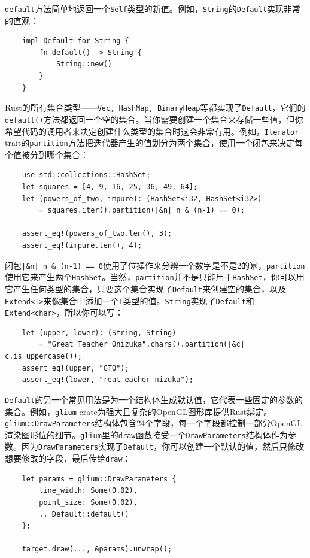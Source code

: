 \texttt{default}方法简单地返回一个\texttt{Self}类型的新值。例如，\texttt{String}的\texttt{Default}实现非常的直观：
\begin{verbatim}
    impl Default for String {
        fn default() -> String {
            String::new()
        }
    }    
\end{verbatim}

Rust的所有集合类型——\texttt{Vec, HashMap, BinaryHeap}等都实现了\texttt{Default}，它们的\texttt{default()}方法都返回一个空的集合。当你需要创建一个集合来存储一些值，但你希望代码的调用者来决定创建什么类型的集合时这会非常有用。例如，\texttt{Iterator} trait的\texttt{partition}方法把迭代器产生的值划分为两个集合，使用一个闭包来决定每个值被分到哪个集合：
\begin{verbatim}
    use std::collections::HashSet;
    let squares = [4, 9, 16, 25, 36, 49, 64];
    let (powers_of_two, impure): (HashSet<i32, HashSet<i32>)
        = squares.iter().partition(|&n| n & (n-1) == 0);
    
    assert_eq!(powers_of_two.len(), 3);
    assert_eq!(impure.len(), 4);
\end{verbatim}

闭包\texttt{|\&n| n \& (n-1) == 0}使用了位操作来分辨一个数字是不是2的幂，\texttt{partition}使用它来产生两个\texttt{HashSet}。当然，\texttt{partition}并不是只能用于\texttt{HashSet}，你可以用它产生任何类型的集合，只要这个集合实现了\texttt{Default}来创建空的集合，以及\texttt{Extend<T>}来像集合中添加一个\texttt{T}类型的值。\texttt{String}实现了\texttt{Default}和\\
\texttt{Extend<char>}，所以你可以写：
\begin{verbatim}
    let (upper, lower): (String, String)
        = "Great Teacher Onizuka".chars().partition(|&c| c.is_uppercase());
    assert_eq!(upper, "GTO");
    assert_eq!(lower, "reat eacher nizuka");
\end{verbatim}

\texttt{Default}的另一个常见用法是为一个结构体生成默认值，它代表一些固定的参数的集合。例如，\texttt{glium} crate为强大且复杂的OpenGL图形库提供Rust绑定。\texttt{glium::DrawParameters}结构体包含24个字段，每一个字段都控制一部分OpenGL渲染图形位的细节。\texttt{glium}里的\texttt{draw}函数接受一个\texttt{DrawParameters}结构体作为参数。因为\texttt{DrawParameters}实现了\texttt{Default}，你可以创建一个默认的值，然后只修改想要修改的字段，最后传给\texttt{draw}：
\begin{verbatim}
    let params = glium::DrawParameters {
        line_width: Some(0.02),
        point_size: Some(0.02),
        .. Default::default()
    };

    target.draw(..., &params).unwrap();
\end{verbatim}

